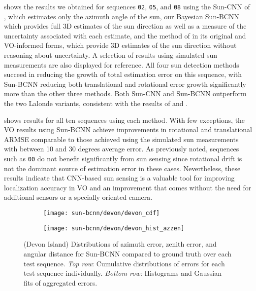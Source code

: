  shows the results we obtained for sequences \texttt{02}, \texttt{05}, and \texttt{08} using the Sun-CNN of \citet{Ma2016-at}, which estimates only the azimuth angle of the sun, our Bayesian Sun-BCNN which provides full 3D estimates of the sun direction as well as a measure of the uncertainty associated with each estimate, and the method of \citet{Lalonde2011-jw} in its original and VO-informed \citep{2017_Clement_Improving} forms, which provide 3D estimates of the sun direction without reasoning about uncertainty.
A selection of results using simulated sun measurements are also displayed for reference.
All four sun detection methods succeed in reducing the growth of total estimation error on this sequence, with Sun-BCNN reducing both translational and rotational error growth significantly more than the other three methods.
Both Sun-CNN and Sun-BCNN outperform the two Lalonde variants, consistent with the results of \citet{Ma2016-at} and \citet{2017_Clement_Improving}.

 shows results for all ten sequences using each method.
With few exceptions, the VO results using Sun-BCNN achieve improvements in rotational and translational ARMSE comparable to those achieved using the simulated sun measurements with between 10 and 30 degrees average error.
As previously noted, sequences such as \texttt{00} do not benefit significantly from sun sensing since rotational drift is not the dominant source of estimation error in these cases.
Nevertheless, these results indicate that CNN-based sun sensing is a valuable tool for improving localization accuracy in VO and an improvement that comes without the need for additional sensors or a specially oriented camera.

\begin{figure}
    \centering
    \begin{subfigure}[b]{0.75\textwidth}
        \texttt{[image: sun-bcnn/devon/devon\_cdf]}
    \end{subfigure} 
    \begin{subfigure}[b]{0.75\textwidth}
        \texttt{[image: sun-bcnn/devon/devon\_hist\_azzen]}
    \end{subfigure}
    \caption{(Devon Island) Distributions of azimuth error, zenith error, and angular distance for Sun-BCNN compared to ground truth over each test sequence. \emph{Top row}: Cumulative distributions of errors for each test sequence individually. \emph{Bottom row:} Histograms and Gaussian fits of aggregated errors.}
    \label{fig:sun-bcnn_devon_cnn_testerrors}
\end{figure}

